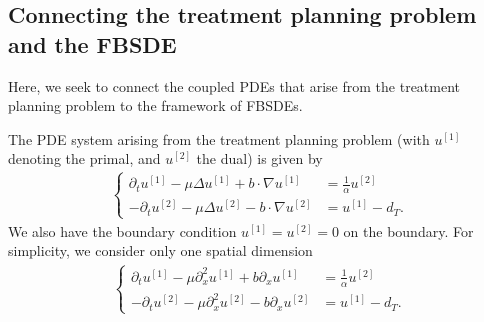 \documentclass{article}  %
\begin{document}
\subsection{Connecting the treatment planning problem and the FBSDE}

Here, we seek to connect the coupled PDEs that arise from the treatment planning problem to the framework of FBSDEs.

The PDE system arising from the treatment planning problem (with $u^{[1]}$ denoting the primal, and $u^{[2]}$ the dual) is given by
%
\begin{align}
    \begin{cases}
    \partial_t u^{[1]} - \mu \Delta u^{[1]} + b \cdot \nabla u^{[1]} &= \frac{1}{\alpha} u^{[2]} \\
    - \partial_t u^{[2]} - \mu \Delta u^{[2]} - b \cdot \nabla u^{[2]} &= u^{[1]} - d_T.
    \end{cases}
\end{align}
%
We also have the boundary condition $u^{[1]}=u^{[2]}=0$ on the boundary. 
%
For simplicity, we consider only one spatial dimension
%
\begin{align}
    \begin{cases}
    \partial_t u^{[1]} - \mu \partial^2_x u^{[1]} + b \partial_x u^{[1]} &= \frac{1}{\alpha} u^{[2]} \\
    - \partial_t u^{[2]} - \mu \partial_x^2 u^{[2]} - b \partial_x u^{[2]} &= u^{[1]} - d_T.
    \end{cases}
\end{align}
%
\end{document}

